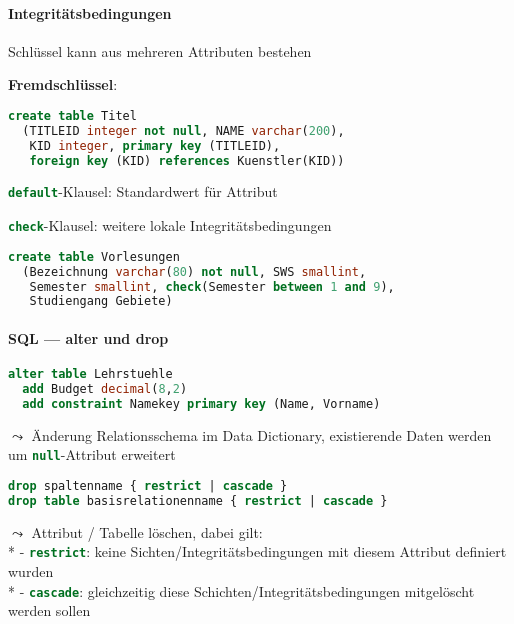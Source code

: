 \paragraph{Integritätsbedingungen}
\begin{items}
	\item Schlüssel kann aus mehreren Attributen bestehen
	\item \textbf{Fremdschlüssel}: \begin{lstlisting}[language=sql]
create table Titel
  (TITLEID integer not null, NAME varchar(200), 
   KID integer, primary key (TITLEID), 
   foreign key (KID) references Kuenstler(KID))
\end{lstlisting}
	\item \lstinline[language=sql]{default}-Klausel: Standardwert für Attribut
	\item \lstinline[language=sql]{check}-Klausel: weitere lokale Integritätsbedingungen
	\item \begin{lstlisting}[language=sql]
create table Vorlesungen
  (Bezeichnung varchar(80) not null, SWS smallint,
   Semester smallint, check(Semester between 1 and 9), 
   Studiengang Gebiete)
\end{lstlisting}
\end{items}



\paragraph{SQL --- alter und drop}
\begin{items}
	\item \begin{lstlisting}[language=sql]
alter table Lehrstuehle
  add Budget decimal(8,2)
  add constraint Namekey primary key (Name, Vorname)
\end{lstlisting}
	\item \( \leadsto \) Änderung Relationsschema im Data Dictionary, existierende Daten werden um \lstinline[language=sql]{null}-Attribut erweitert
	\item \begin{lstlisting}[language=sql]
drop spaltenname { restrict | cascade }
drop table basisrelationenname { restrict | cascade }
\end{lstlisting}
\item \( \leadsto \) Attribut / Tabelle löschen, dabei gilt: \\*
	- \lstinline[language=sql]{restrict}: keine Sichten/Integritätsbedingungen mit diesem Attribut definiert wurden \\*
	- \lstinline[language=sql]{cascade}: gleichzeitig diese Schichten/Integritätsbedingungen mitgelöscht werden sollen
\end{items}

